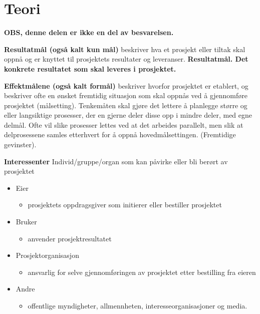 \section{Teori}

{\bf OBS, denne delen er ikke en del av besvarelsen.}

{\bf Resultatmål (også kalt kun mål)} beskriver hva et prosjekt eller tiltak skal oppnå og er knyttet 
til prosjektets resultater og leveranser. {\bf \color{red} Resultatmål. Det konkrete resultatet 
som skal leveres i prosjektet.}


{\bf Effektmålene (også kalt formål)} beskriver hvorfor prosjektet er etablert, og beskriver ofte en 
ønsket fremtidig situasjon som skal oppnås ved å gjennomføre prosjektet (målsetting).
Tenkemåten skal gjøre det lettere å planlegge større og eller langsiktige prosesser, der en gjerne 
deler disse opp i mindre deler, med egne delmål. Ofte vil slike prosesser lettes ved at det arbeides
 parallelt, men slik at delprosessene samles etterhvert for å oppnå hovedmålsettingen.
 (Fremtidige gevinster).

{\bf Interessenter}
Individ/gruppe/organ som kan påvirke eller bli 
berørt av prosjektet
	\begin{itemize}
		\item Eier 
				\begin{itemize}
					\item prosjektets oppdragsgiver som initierer eller bestiller prosjektet 
				\end{itemize}
		\item Bruker 
			\begin{itemize}
				\item anvender prosjektresultatet
			\end{itemize}
		\item Prosjektorganisasjon 
			\begin{itemize}
				\item ansvarlig for selve gjennomføringen av prosjektet etter bestilling fra eieren 
			\end{itemize}
		\item Andre 
			\begin{itemize}
				\item offentlige myndigheter, allmennheten,  interesseorganisasjoner og media.
			\end{itemize}
	\end{itemize}
